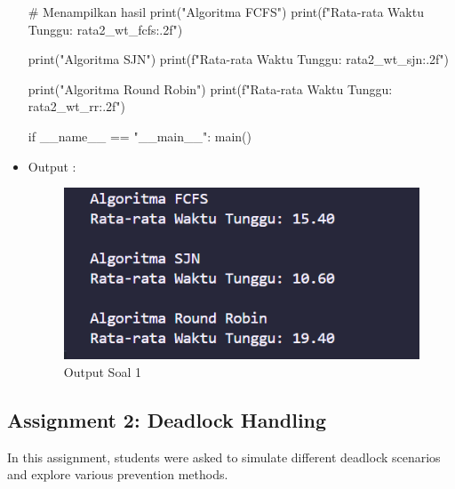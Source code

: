 \documentclass[12pt]{article}
\begin{document}
\begin{itemize}
\begin{python}
    # Menampilkan hasil
    print("Algoritma FCFS")
    print(f"Rata-rata Waktu Tunggu: {rata2_wt_fcfs:.2f}\n")

    print("Algoritma SJN")
    print(f"Rata-rata Waktu Tunggu: {rata2_wt_sjn:.2f}\n")

    print("Algoritma Round Robin")
    print(f"Rata-rata Waktu Tunggu: {rata2_wt_rr:.2f}\n")

if __name__ == "__main__":
    main()
\end{python}
    \item Output : 
    \begin{figure}[h]
        \centering
        \includegraphics[width=0.80\linewidth]{b_class/asset/output1.png}
        \caption{Output Soal 1}
        \label{fig:enter-label}
    \end{figure}
\end{itemize}

\subsection{Assignment 2: Deadlock Handling}
In this assignment, students were asked to simulate different deadlock scenarios and explore various prevention methods.
\subsubsection{}
\subsubsection{}
\subsubsection{}
\subsubsection{}
\subsubsection{}
\end{document}
